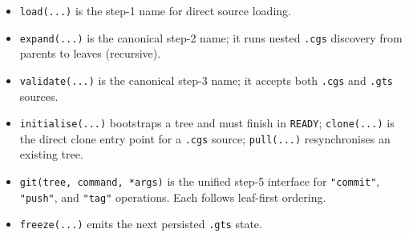 \begin{itemize}
  \item \texttt{load(...)} is the step-1 name for direct source loading.
  \item \texttt{expand(...)} is the canonical step-2 name; it runs nested
    \texttt{.cgs} discovery from parents to leaves (recursive).
  \item \texttt{validate(...)} is the canonical step-3 name; it accepts both
    \texttt{.cgs} and \texttt{.gts} sources.
  \item \texttt{initialise(...)} bootstraps a tree and must finish in
    \texttt{READY}; \texttt{clone(...)} is the direct clone entry point for a
    \texttt{.cgs} source; \texttt{pull(...)} resynchronises an existing tree.
  \item \texttt{git(tree, command, *args)} is the unified step-5 interface for
    \texttt{"commit"}, \texttt{"push"}, and \texttt{"tag"} operations.  Each
    follows leaf-first ordering.
  \item \texttt{freeze(...)} emits the next persisted \texttt{.gts} state.
\end{itemize}

